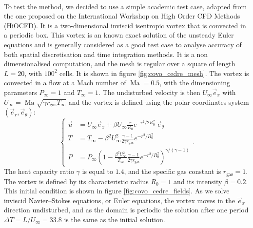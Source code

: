     \paragraph{}
    To test the method, we decided to use a simple academic test case, adapted from the one proposed on the International Workshop on High Order CFD Methods (HiOCFD).
    It is a two-dimensional inviscid isentropic vortex that is convected in a periodic box.
    This vortex is an known exact solution of the unsteady Euler equations and is generally considered as a good test case to analyse accuracy of both spatial discretisation and time integration methods.
    It is a non dimensionalised computation, and the mesh is regular over a square of length $L = 20$, with $100^2$ cells.
    It is shown in figure \ref{fig:covo_cedre_mesh}.
    The vortex is convected in a flow at a Mach number of $\operatorname{Ma} = 0.5$, with the dimensioning parameters $P_\infty = 1$ and $T_\infty = 1$.
    The undisturbed velocity is then $U_\infty \vec{e}_x$ with $U_\infty = \operatorname{Ma} \sqrt{\gamma r_\textrm{gas} T_\infty}$ and the vortex is defined using the polar coordinates system $\left(\vec{e}_r, \vec{e}_\theta\right)$:
    \begin{equation}\label{eq:covo}
      \left\{\begin{aligned}
        \vec{u} &= U_\infty \vec{e}_x + \beta U_\infty \frac{r}{R_0} e^{-r^2 / 2 R_0^2} \ \vec{e}_\theta \\[10pt]
        T &= T_\infty - \beta^2 U_\infty^2 \frac{\gamma - 1}{2 \gamma r_\textrm{gas}} e^{-r^2 / R_0^2} \\[10pt]
        P &= P_\infty \left( 1 - \frac{\beta^2 U_\infty^2}{T_\infty} \frac{\gamma - 1}{2 \gamma r_\textrm{gas}} e^{-r^2 / R_0^2} \right)^{\gamma/\left(\gamma - 1\right)}
      \end{aligned}\right. .
    \end{equation}
    The heat capacity ratio $\gamma$ is equal to $1.4$, and the specific gas constant is $r_\textrm{gas} = 1$.
    The vortex is defined by its characteristic radius $R_0 = 1$ and its intensity $\beta = 0.2$.
    This initial condition is shown in figure \ref{fig:covo_cedre_fields}.
    As we solve inviscid Navier--Stokes equations, or Euler equations, the vortex moves in the $\vec{e}_x$ direction undisturbed, and as the domain is periodic the solution after one period $\Delta T = L/U_\infty = 33.8$ is the same as the initial solution.


